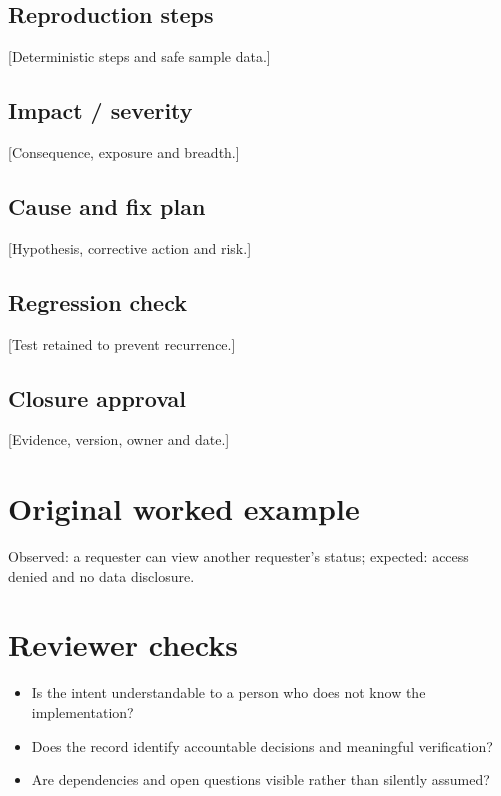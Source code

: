 \documentclass[11pt,letterpaper]{article}
\begin{document}
\subsection{Reproduction steps}
[Deterministic steps and safe sample data.]

\subsection{Impact / severity}
[Consequence, exposure and breadth.]

\subsection{Cause and fix plan}
[Hypothesis, corrective action and risk.]

\subsection{Regression check}
[Test retained to prevent recurrence.]

\subsection{Closure approval}
[Evidence, version, owner and date.]

\section{Original worked example}
\begin{tcolorbox}[colback=tealback,colframe=navy,title={Illustrative entry},breakable]
Observed: a requester can view another requester’s status; expected: access denied and no data disclosure.

\end{tcolorbox}
\section{Reviewer checks}
\begin{itemize}[leftmargin=*,itemsep=2pt]
\item Is the intent understandable to a person who does not know the implementation?
\item Does the record identify accountable decisions and meaningful verification?
\item Are dependencies and open questions visible rather than silently assumed?
\end{itemize}
\end{document}
